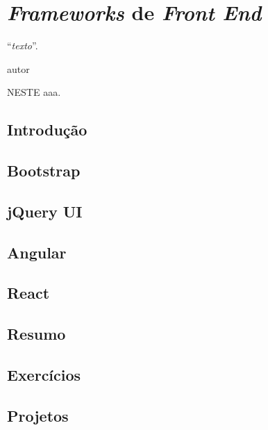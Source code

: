 \chapter{\textit{Frameworks} de \textit{Front End}}
\epigraph{``\textit{texto}''.}{autor}

\lettrine[lines=4, lhang=0.1, lraise=0, loversize=0.2, findent=0.1em]{\textcolor{corAzulTema}{N}}{ESTE} aaa.

\section{Introdução}

\section{Bootstrap}

\section{jQuery UI}

\section{Angular}

\section{React}

\section{Resumo}

\section{Exercícios}

\section{Projetos}

